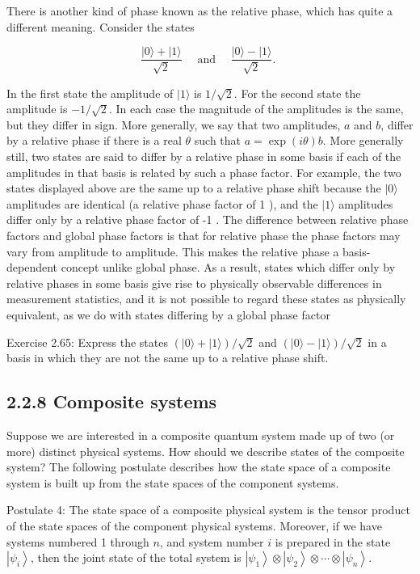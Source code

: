 \documentclass[10pt]{article}
\begin{document}
There is another kind of phase known as the relative phase, which has quite a different meaning. Consider the states


\begin{equation*}
\frac{|0\rangle+|1\rangle}{\sqrt{2}} \quad \text { and } \quad \frac{|0\rangle-|1\rangle}{\sqrt{2}} \text {. } \tag{2.121}
\end{equation*}


In the first state the amplitude of $|1\rangle$ is $1 / \sqrt{2}$. For the second state the amplitude is $-1 / \sqrt{2}$. In each case the magnitude of the amplitudes is the same, but they differ in sign. More generally, we say that two amplitudes, $a$ and $b$, differ by a relative phase if there is a real $\theta$ such that $a=\exp (i \theta) b$. More generally still, two states are said to differ by a relative phase in some basis if each of the amplitudes in that basis is related by such a phase factor. For example, the two states displayed above are the same up to a relative phase shift because the $|0\rangle$ amplitudes are identical (a relative phase factor of 1 ), and the $|1\rangle$ amplitudes differ only by a relative phase factor of -1 . The difference between relative phase factors and global phase factors is that for relative phase the phase factors may vary from amplitude to amplitude. This makes the relative phase a basis-dependent concept unlike global phase. As a result, states which differ only by relative phases in some basis give rise to physically observable differences in measurement statistics, and it is not possible to regard these states as physically equivalent, as we do with states differing by a global phase factor

Exercise 2.65: Express the states $(|0\rangle+|1\rangle) / \sqrt{2}$ and $(|0\rangle-|1\rangle) / \sqrt{2}$ in a basis in which they are not the same up to a relative phase shift.

\subsection*{2.2.8 Composite systems}
Suppose we are interested in a composite quantum system made up of two (or more) distinct physical systems. How should we describe states of the composite system? The following postulate describes how the state space of a composite system is built up from the state spaces of the component systems.

Postulate 4: The state space of a composite physical system is the tensor product of the state spaces of the component physical systems. Moreover, if we have systems numbered 1 through $n$, and system number $i$ is prepared in the state $\left|\psi_{i}\right\rangle$, then the joint state of the total system is $\left|\psi_{1}\right\rangle \otimes\left|\psi_{2}\right\rangle \otimes \cdots \otimes\left|\psi_{n}\right\rangle$.
\end{document}
